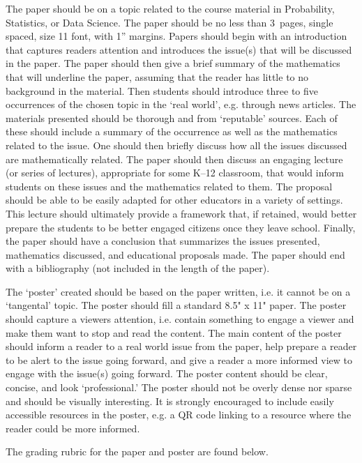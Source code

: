 \documentclass[11pt,letterpaper]{article}
\begin{document}
 The paper should be on a topic related to the course material in Probability, Statistics, or Data Science. The paper should be no less than 3~pages, single spaced, size 11 font, with 1'' margins. Papers should begin with an introduction that captures readers attention and introduces the issue(s) that will be discussed in the paper. The paper should then give a brief summary of the mathematics that will underline the paper, assuming that the reader has little to no background in the material. Then students should introduce three to five occurrences of the chosen topic in the `real world', e.g. through news articles. The materials presented should be thorough and from `reputable' sources. Each of these should include a summary of the occurrence as well as the mathematics related to the issue. One should then briefly discuss how all the issues discussed are mathematically related. The paper should then discuss an engaging lecture (or series of lectures), appropriate for some K--12 classroom, that would inform students on these issues and the mathematics related to them. The proposal should be able to be easily adapted for other educators in a variety of settings. This lecture should ultimately provide a framework that, if retained, would better prepare the students to be better engaged citizens once they leave school. Finally, the paper should have a conclusion that summarizes the issues presented, mathematics discussed, and educational proposals made. The paper should end with a bibliography (not included in the length of the paper). \pspace

The `poster' created should be based on the paper written, i.e. it cannot be on a `tangental' topic. The poster should fill a standard 8.5" x 11" paper. The poster should capture a viewers attention, i.e. contain something to engage a viewer and make them want to stop and read the content. The main content of the poster should inform a reader to a real world issue from the paper, help prepare a reader to be alert to the issue going forward, and give a reader a more informed view to engage with the issue(s) going forward. The poster content should be clear, concise, and look `professional.' The poster should not be overly dense nor sparse and should be visually interesting. It is strongly encouraged to include easily accessible resources in the poster, e.g. a QR code linking to a resource where the reader could be more informed. \pspace

 The grading rubric for the paper and poster are found below. \pspace
\end{document}
